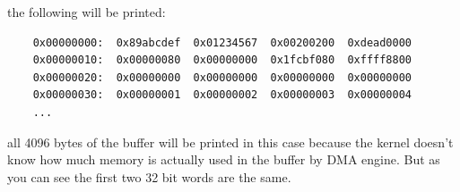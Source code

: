 the following will be printed:
\begin{verbatim}
	0x00000000:  0x89abcdef  0x01234567  0x00200200  0xdead0000
	0x00000010:  0x00000080  0x00000000  0x1fcbf080  0xffff8800
	0x00000020:  0x00000000  0x00000000  0x00000000  0x00000000
	0x00000030:  0x00000001  0x00000002  0x00000003  0x00000004
	...
\end{verbatim}
all 4096 bytes of the buffer will be printed in this case because the kernel doesn't know how much memory is actually used in the buffer by DMA engine. But as you can see the first two 32 bit words are the same.





